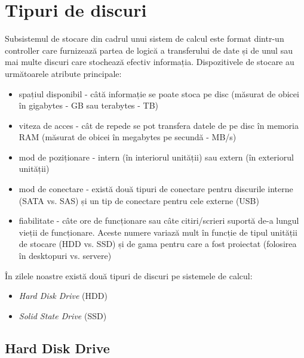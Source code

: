 \section{Tipuri de discuri}
\label{sec:storage:type}

Subsistemul de stocare din cadrul unui sistem de calcul este format dintr-un
controller care furnizează partea de logică a transferului de date și de unul
sau mai multe discuri care stochează efectiv informația. Dispozitivele de
stocare au următoarele atribute principale:

\begin{itemize}
  \item spațiul disponibil - câtă informație se poate stoca pe disc
    (măsurat de obicei în gigabytes - GB sau terabytes - TB)
  \item viteza de acces - cât de repede se pot transfera datele de pe disc
    în memoria RAM (măsurat de obicei în megabytes pe secundă - MB/s)
  \item mod de poziționare - intern (în interiorul unității) sau extern
    (în exteriorul unității)
  \item mod de conectare - există două tipuri de conectare pentru
    discurile interne (SATA vs. SAS) și un tip de conectare pentru cele externe (USB)
  \item fiabilitate - câte ore de funcționare sau câte citiri/scrieri
    suportă de-a lungul vieții de funcționare. Aceste numere variază
    mult în funcție de tipul unității de stocare (HDD vs. SSD) și de
    gama pentru care a fost proiectat (folosirea în desktopuri vs.
    servere)
\end{itemize}

În zilele noastre există două tipuri de discuri pe sistemele de calcul:

\begin{itemize}
  \item \textit{Hard Disk Drive} (HDD)
  \item \textit{Solid State Drive} (SSD)
\end{itemize}

\subsection{Hard Disk Drive}
\label{sec:storage:type:hdd}

